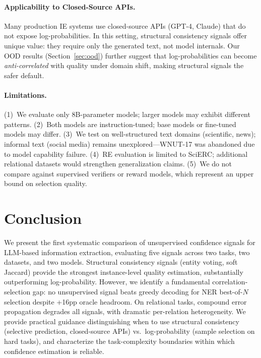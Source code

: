\documentclass[11pt,a4paper]{article}
\begin{document}
\paragraph{Applicability to Closed-Source APIs.}
Many production IE systems use closed-source APIs (GPT-4, Claude) that do not expose log-probabilities.
In this setting, structural consistency signals offer unique value: they require only the generated text, not model internals.
Our OOD results (Section~\ref{sec:ood}) further suggest that log-probabilities can become \emph{anti-correlated} with quality under domain shift, making structural signals the safer default.

\paragraph{Limitations.}
(1)~We evaluate only 8B-parameter models; larger models may exhibit different patterns.
(2)~Both models are instruction-tuned; base models or fine-tuned models may differ.
(3)~We test on well-structured text domains (scientific, news); informal text (social media) remains unexplored---WNUT-17 was abandoned due to model capability failure.
(4)~RE evaluation is limited to SciERC; additional relational datasets would strengthen generalization claims.
(5)~We do not compare against supervised verifiers or reward models, which represent an upper bound on selection quality.

\section{Conclusion}
\label{sec:conclusion}

We present the first systematic comparison of unsupervised confidence signals for LLM-based information extraction, evaluating five signals across two tasks, two datasets, and two models.
Structural consistency signals (entity voting, soft Jaccard) provide the strongest instance-level quality estimation, substantially outperforming log-probability.
However, we identify a fundamental correlation-selection gap: no unsupervised signal beats greedy decoding for NER best-of-$N$ selection despite +16pp oracle headroom.
On relational tasks, compound error propagation degrades all signals, with dramatic per-relation heterogeneity.
We provide practical guidance distinguishing when to use structural consistency (selective prediction, closed-source APIs) vs.\ log-probability (sample selection on hard tasks), and characterize the task-complexity boundaries within which confidence estimation is reliable.
\end{document}
